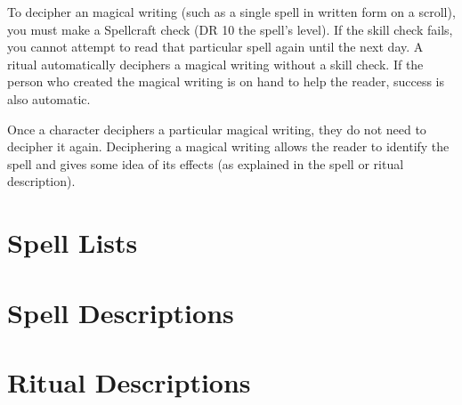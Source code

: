         To decipher an magical writing (such as a single spell in written form on a scroll), you must make a Spellcraft check (DR 10 \add the spell's level). If the skill check fails, you cannot attempt to read that particular spell again until the next day.
        A  ritual automatically deciphers a magical writing without a skill check.
        If the person who created the magical writing is on hand to help the reader, success is also automatic.

        Once a character deciphers a particular magical writing, they do not need to decipher it again.
        Deciphering a magical writing allows the reader to identify the spell and gives some idea of its effects (as explained in the spell or ritual description).
        

\section{Spell Lists}



\section{Spell Descriptions}



\section{Ritual Descriptions}


